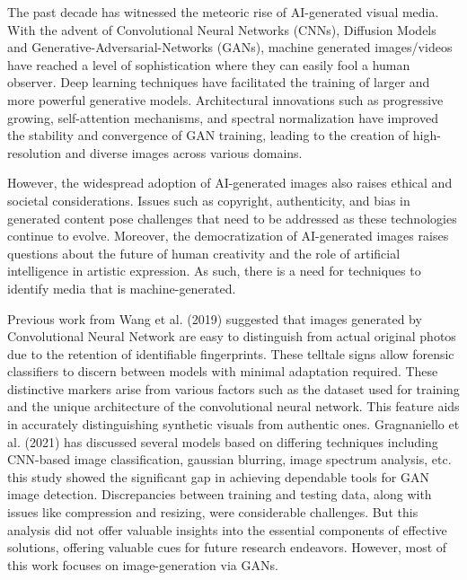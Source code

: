 The past decade has witnessed the meteoric rise of AI-generated visual media. With the advent of Convolutional Neural Networks (CNNs), Diffusion Models and Generative-Adversarial-Networks (GANs), machine generated images/videos have reached a level of sophistication where they can easily fool a human observer. Deep learning techniques have facilitated the training of larger and more powerful generative models. Architectural innovations such as progressive growing, self-attention mechanisms, and spectral normalization have improved the stability and convergence of GAN training, leading to the creation of high-resolution and diverse images across various domains. 

However, the widespread adoption of AI-generated images also raises ethical and societal considerations. Issues such as copyright, authenticity, and bias in generated content pose challenges that need to be addressed as these technologies continue to evolve. Moreover, the democratization of AI-generated images raises questions about the future of human creativity and the role of artificial intelligence in artistic expression. As such, there is a need for techniques to identify media that is machine-generated. 

Previous work from Wang et al. (2019)  \cite{3} suggested that images generated by Convolutional Neural Network are easy to distinguish from actual original photos due to the retention of identifiable fingerprints. These telltale signs allow forensic classifiers to discern between models with minimal adaptation required. These distinctive markers arise from various factors such as the dataset used for training and the unique architecture of the convolutional neural network. This feature aids in accurately distinguishing synthetic visuals from authentic ones. Gragnaniello et al. (2021)  \cite{4} has discussed several models based on differing techniques including CNN-based image classification, gaussian blurring, image spectrum analysis, etc. this study showed the significant gap in achieving dependable tools for GAN image detection. Discrepancies between training and testing data, along with issues like compression and resizing, were considerable challenges. But this analysis did not offer valuable insights into the essential components of effective solutions, offering valuable cues for future research endeavors. However, most of this work focuses on image-generation via GANs. 

